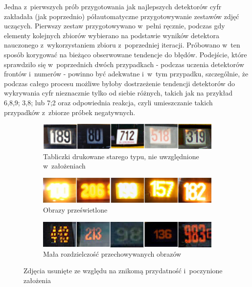 Jedna z~pierwszych prób przygotowania jak najlepszych 
detektorów cyfr zakładała (jak poprzednio)
półautomatyczne przygotowywanie zestawów zdjęć uczących. Pierwszy
zestaw przygotowywano w~pełni ręcznie, podczas gdy
elementy kolejnych zbiorów wybierano na podstawie
wyników detektora nauczonego z~wykorzystaniem zbioru 
z~poprzedniej iteracji. Próbowano w~ten sposób
korygować na bieżąco obserwowane tendencje do błędów.
Podejście, które sprawdziło się w~poprzednich dwóch przypadkach - 
podczas uczenia detektorów frontów i~numerów - 
powinno być adekwatne i~w~tym przypadku, szczególnie, że
podczas całego procesu możliwe byłoby dostrzeżenie tendencji
detektorów do wykrywania cyfr nieznacznie tylko od siebie różnych, takich jak
na przykład 6,8,9; 3,8; lub 7;2 oraz odpowiednia reakcja, czyli
umieszczanie takich przypadków z~zbiorze próbek negatywnych.


\begin{figure}[h!]\centering
	\begin{subfigure}{.55\linewidth}\centering
		\centering
		\includegraphics[width=1\textwidth]{img/usunieteNumery/stare}
		\caption{Tabliczki drukowane starego typu, nie uwzględnione
			w~założeniach}
	\end{subfigure}
	\hfill	
	\begin{subfigure}{.55\linewidth}\centering
		\centering
		\includegraphics[width=1\textwidth]{img/usunieteNumery/przeswietlone}
		\caption{Obrazy prześwietlone}
	\end{subfigure}
	\hfill	
	\begin{subfigure}{.55\linewidth}\centering
		\centering
		\includegraphics[width=1\textwidth]{img/usunieteNumery/rozdzielczosc}
		\caption{Mała rozdzielczość przechowywanych obrazów}
	\end{subfigure}
	\caption{Zdjęcia usunięte ze względu na znikomą przydatność i~poczynione
		założenia}
	\label{fig:removedNumbersCauseDamagedSkipped}
\end{figure}

